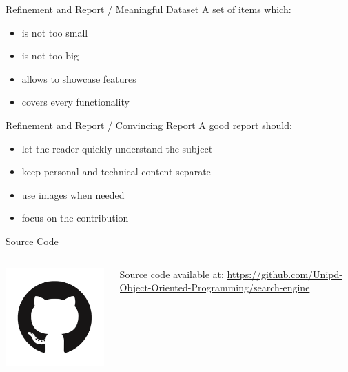 \documentclass[11pt]{beamer}
\begin{document}
\begin{frame}{Refinement and Report / Meaningful Dataset}
 A set of items which:
 
 \begin{itemize}
  \item is not too small
  \item is not too big
  \item allows to showcase features
  \item covers every functionality
 \end{itemize}
\end{frame}


\begin{frame}{Refinement and Report / Convincing Report}
 A good report should:
 
 \begin{itemize}
  \item let the reader quickly understand the subject
  \item keep personal and technical content separate
  \item use images when needed
  \item focus on the contribution
 \end{itemize}
\end{frame}


\begin{frame}{Source Code}
 \begin{columns}
  \begin{column}{0.15\textwidth}
   \includegraphics[width=0.99\textwidth]{assets/logo-github}
  \end{column}
  \begin{column}{0.85\textwidth}
   Source code available at:
   \url{https://github.com/Unipd-Object-Oriented-Programming/search-engine}
  \end{column}
 \end{columns}
\end{frame}
\end{document}
